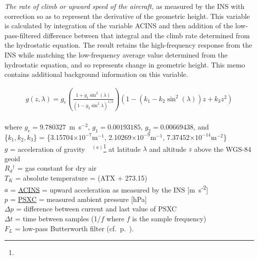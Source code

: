 \documentclass[
]{book}
\begin{document}
\emph{The rate of climb or upward speed of the aircraft,} as measured by the INS with correction so as to represent the derivative of the geometric height. This variable is calculated by integration of the variable ACINS and then addition of the low-pass-filtered difference between that integral and the climb rate determined from the hydrostatic equation. The result retains the high-frequency response from the INS while matching the low-frequency average value determined from the hydrostatic equation, and so represents change in geometric height. This memo contains additional background information on this variable.

\begin{align}
g(z,\lambda)=g_{e}\left(\frac{1+g_{1}\sin^{2}(\lambda)}{(1-g_{2}\sin^{2}\lambda)^{1/2}}\right)(1-(k_{1}-k_{2}\sin^{2}(\lambda))z+k_{3}z^{2})
\label{eq:gsublambda}
\end{align}\\
\hspace*{0.333em}\hspace*{0.333em}\hspace*{0.333em}\hspace*{0.333em}\hspace*{0.333em}\hspace*{0.333em}\hspace*{0.333em}where \(g_{e}=9.780327\)~m~s\(^{-2}\), \(g_{1}=0.00193185\), \(g_{2}=0.00669438\), and\\
\hspace*{0.333em}\hspace*{0.333em}\hspace*{0.333em}\hspace*{0.333em}\hspace*{0.333em}\hspace*{0.333em}\hspace*{0.333em} \{\(k_{1},k_{2},k_{3}\)\} = \{3.15704\(\times 10^{-7}\mathrm{m}^{-1}\),
2.10269\(\times 10^{-9}\mathrm{m}^{-1}\), 7.37452\(\times 10^{-14}\mathrm{m}^{-2}\)\}\\
\(g\) = \label{-constant-g}acceleration of gravity~~\(^{(a)}\)\footnote{ } at latitude \(\lambda\) and altitude \(z\) above the WGS-84 geoid\\
\(R_{d}{}^{\dagger}\) = gas constant for dry air\\
\(T_{K}\) = absolute temperature = (ATX + 273.15)\\
\(a\) = \protect\hyperlink{acins}{ACINS} = upward acceleration as measured by the INS {[}m~s\textsuperscript{-2}{]}\\
\(p\) = \protect\hyperlink{psx}{PSXC} = measured ambient pressure {[}hPa{]}\\
\(\Delta p\) = difference between current and last value of PSXC\\
\(\Delta t\) = time between samples (1/\(f\) where \(f\) is the sample
frequency)\\
\(F_{L}\) = low-pass Butterworth filter (cf.~p.~\pageref{compFilter}).
\end{document}
